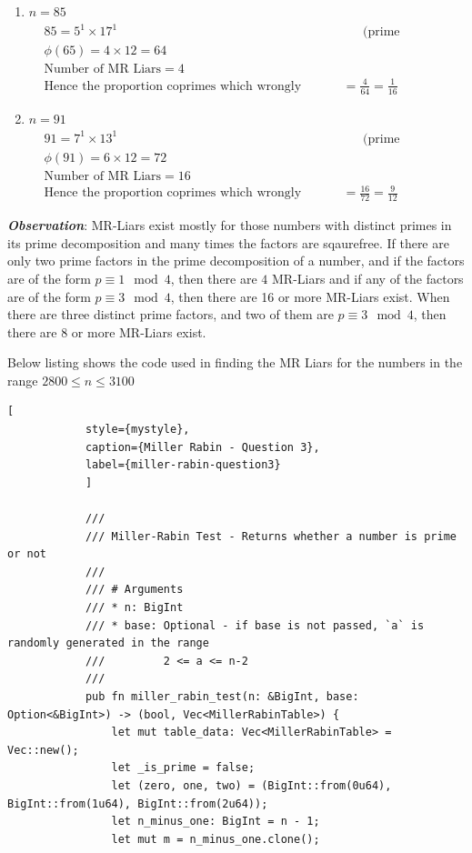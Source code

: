 \documentclass[11pt,a4paper]{article}
\begin{document}
\begin{enumerate}[1.]
\begin{enumerate}[3.]
\begin{flushleft}
\begin{enumerate}[1.]
				\item $n = 85$
				\begin{align}
					& 85 = 5^1 \times 17^1 &&\text{(prime factorisation)}\nonumber\\
					& \phi(65) = 4 \times 12 = 64 \nonumber\\
					& \text{Number of MR Liars} = 4\nonumber\\
					& \text{Hence the proportion coprimes which wrongly declares 85 as prime} = \frac{4}{64} = \frac{1}{16} \nonumber
				\end{align}
				
				\item $n = 91$
				\begin{align}
					& 91 = 7^1 \times 13^1 &&\text{(prime factorisation)}\nonumber\\
					& \phi(91) = 6 \times 12 = 72 \nonumber\\
					& \text{Number of MR Liars} = 16\nonumber\\
					& \text{Hence the proportion coprimes which wrongly declares 85 as prime} = \frac{16}{72} = \frac{9}{12} \nonumber
				\end{align}
			\end{enumerate}
			
			\textbf{\textit{Observation}}: MR-Liars exist mostly for those numbers with distinct primes in its prime decomposition and many times the factors are sqaurefree. If there are only two prime factors in the prime decomposition of a number, and if the factors are of the form $p \equiv 1\mod4$, then there are $4$ MR-Liars and if any of the factors are of the form $p \equiv 3\mod4$, then there are 16 or more MR-Liars exist. When there are three distinct prime factors, and two of them are $p \equiv 3 \mod 4$, then there are $8$ or more MR-Liars exist. 
		\end{flushleft}
		
		\medskip
		Below listing shows the code used in finding the MR Liars for the numbers in the range $2800 \le n \le 3100$
		
		\begin{lstlisting}[
			style={mystyle},
			caption={Miller Rabin - Question 3},
			label={miller-rabin-question3}
			]
			
			///
			/// Miller-Rabin Test - Returns whether a number is prime or not
			///
			/// # Arguments
			/// * n: BigInt
			/// * base: Optional - if base is not passed, `a` is randomly generated in the range
			///         2 <= a <= n-2
			///
			pub fn miller_rabin_test(n: &BigInt, base: Option<&BigInt>) -> (bool, Vec<MillerRabinTable>) {
				let mut table_data: Vec<MillerRabinTable> = Vec::new();
				let _is_prime = false;
				let (zero, one, two) = (BigInt::from(0u64), BigInt::from(1u64), BigInt::from(2u64));
				let n_minus_one: BigInt = n - 1;
				let mut m = n_minus_one.clone();
				

\end{lstlisting}
\end{enumerate}
\end{enumerate}
\end{document}
